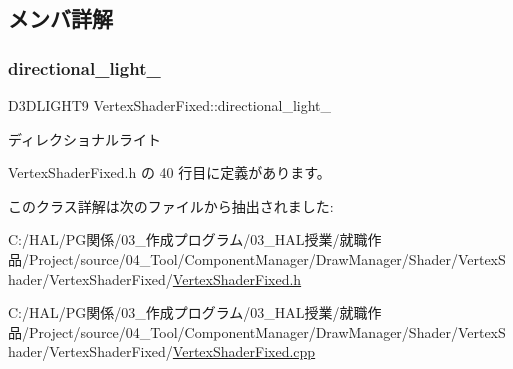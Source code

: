 \subsection{メンバ詳解}
\mbox{\label{class_vertex_shader_fixed_ae2409965de90816f89ba8797880b3cd2}} 
\subsubsection{\texorpdfstring{directional\+\_\+light\+\_\+}{directional\_light\_}}
{\footnotesize\ttfamily D3\+D\+L\+I\+G\+H\+T9 Vertex\+Shader\+Fixed\+::directional\+\_\+light\+\_\+\hspace{0.3cm}{\ttfamily [private]}}



ディレクショナルライト 



 Vertex\+Shader\+Fixed.\+h の 40 行目に定義があります。



このクラス詳解は次のファイルから抽出されました\+:\begin{DoxyCompactItemize}
\item 
C\+:/\+H\+A\+L/\+P\+G関係/03\+\_\+作成プログラム/03\+\_\+\+H\+A\+L授業/就職作品/\+Project/source/04\+\_\+\+Tool/\+Component\+Manager/\+Draw\+Manager/\+Shader/\+Vertex\+Shader/\+Vertex\+Shader\+Fixed/\mbox{\hyperlink{_vertex_shader_fixed_8h}{Vertex\+Shader\+Fixed.\+h}}\item 
C\+:/\+H\+A\+L/\+P\+G関係/03\+\_\+作成プログラム/03\+\_\+\+H\+A\+L授業/就職作品/\+Project/source/04\+\_\+\+Tool/\+Component\+Manager/\+Draw\+Manager/\+Shader/\+Vertex\+Shader/\+Vertex\+Shader\+Fixed/\mbox{\hyperlink{_vertex_shader_fixed_8cpp}{Vertex\+Shader\+Fixed.\+cpp}}\end{DoxyCompactItemize}
